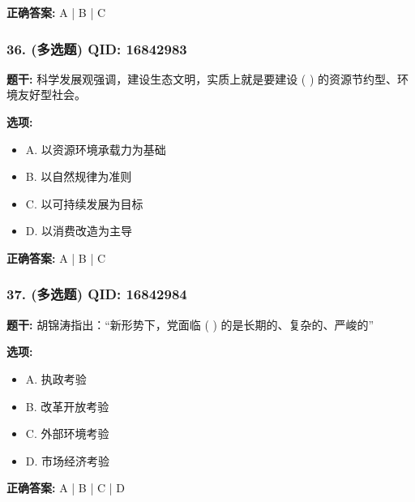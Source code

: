 \documentclass[12pt,UTF8]{ctexart}
\begin{document}
\textbf{正确答案:}
A | B | C

\vspace{0.3em}\hrulefill\vspace{0.7em}

\subsubsection*{36. (多选题) \small QID: 16842983}

\textbf{题干:}
科学发展观强调，建设生态文明，实质上就是要建设 ( ) 的资源节约型、环境友好型社会。

\textbf{选项:}
\begin{itemize}[leftmargin=*]

  \item A. 以资源环境承载力为基础

  \item B. 以自然规律为准则

  \item C. 以可持续发展为目标

  \item D. 以消费改造为主导

\end{itemize}

\textbf{正确答案:}
A | B | C

\vspace{0.3em}\hrulefill\vspace{0.7em}

\subsubsection*{37. (多选题) \small QID: 16842984}

\textbf{题干:}
胡锦涛指出：“新形势下，党面临 ( ) 的是长期的、复杂的、严峻的”

\textbf{选项:}
\begin{itemize}[leftmargin=*]

  \item A. 执政考验

  \item B. 改革开放考验

  \item C. 外部环境考验

  \item D. 市场经济考验

\end{itemize}

\textbf{正确答案:}
A | B | C | D

\vspace{0.3em}\hrulefill\vspace{0.7em}
\end{document}
